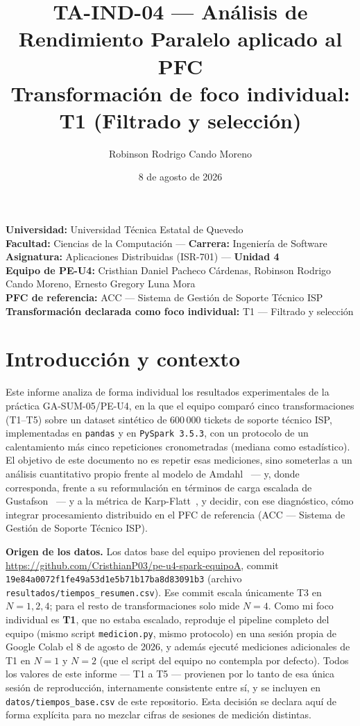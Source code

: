 \documentclass[11pt,a4paper]{article}
\title{%
  TA-IND-04 --- Análisis de Rendimiento Paralelo aplicado al PFC\\
  \large Transformación de foco individual: T1 (Filtrado y selección)
}
\author{Robinson Rodrigo Cando Moreno}
\date{8 de agosto de 2026}
\begin{document}
\maketitle

\noindent
\textbf{Universidad:} Universidad Técnica Estatal de Quevedo \\
\textbf{Facultad:} Ciencias de la Computación --- \textbf{Carrera:} Ingeniería de Software \\
\textbf{Asignatura:} Aplicaciones Distribuidas (ISR-701) --- \textbf{Unidad 4} \\
\textbf{Equipo de PE-U4:} Cristhian Daniel Pacheco Cárdenas, Robinson Rodrigo Cando Moreno, Ernesto Gregory Luna Mora \\
\textbf{PFC de referencia:} ACC --- Sistema de Gestión de Soporte Técnico ISP \\
\textbf{Transformación declarada como foco individual:} T1 --- Filtrado y selección

\section{Introducción y contexto}

Este informe analiza de forma individual los resultados experimentales de la práctica
GA-SUM-05/PE-U4, en la que el equipo comparó cinco transformaciones (T1--T5) sobre un
dataset sintético de 600\,000 tickets de soporte técnico ISP, implementadas en
\texttt{pandas} y en \texttt{PySpark 3.5.3}, con un protocolo de un calentamiento
más cinco repeticiones cronometradas (mediana como estadístico). El objetivo de este
documento no es repetir esas mediciones, sino someterlas a un análisis cuantitativo
propio frente al modelo de Amdahl~\cite{amdahl1967} --- y, donde corresponda, frente
a su reformulación en términos de carga escalada de Gustafson~\cite{gustafson1988} ---
y a la métrica de Karp-Flatt~\cite{karpflatt1990}, y decidir, con ese diagnóstico, cómo integrar
procesamiento distribuido en el PFC de referencia (ACC --- Sistema de Gestión de
Soporte Técnico ISP).

\textbf{Origen de los datos.} Los datos base del equipo provienen del repositorio
\url{https://github.com/CristhianP03/pe-u4-spark-equipoA}, commit
\texttt{19e84a0072f1fe49a53d1e5b71b17ba8d83091b3} (archivo
\texttt{resultados/tiempos\_resumen.csv}). Ese commit escala únicamente T3 en
$N=1,2,4$; para el resto de transformaciones solo mide $N=4$. Como mi foco
individual es \textbf{T1}, que no estaba escalado, reproduje el pipeline completo
del equipo (mismo script \texttt{medicion.py}, mismo protocolo) en una sesión propia
de Google Colab el 8 de agosto de 2026, y además ejecuté mediciones adicionales de
T1 en $N=1$ y $N=2$ (que el script del equipo no contempla por defecto). Todos los
valores de este informe --- T1 a T5 --- provienen por lo tanto de esa única sesión
de reproducción, internamente consistente entre sí, y se incluyen en
\texttt{datos/tiempos\_base.csv} de este repositorio. Esta decisión se declara aquí
de forma explícita para no mezclar cifras de sesiones de medición distintas.
\end{document}
